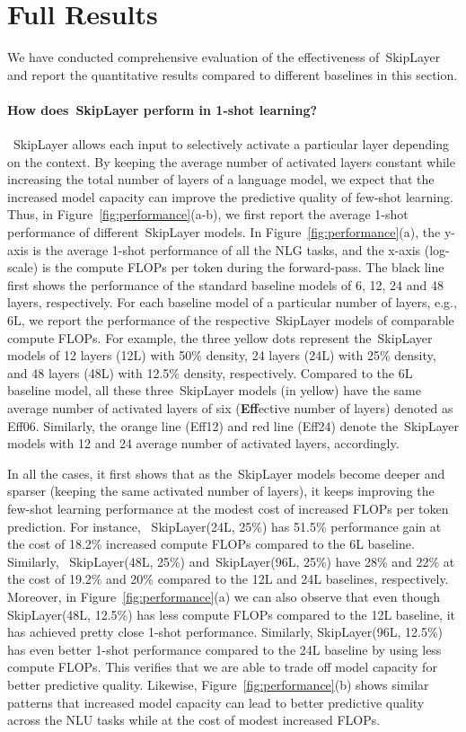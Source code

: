 \documentclass{article}
\newcommand{\skipl}{SkipLayer\xspace}
\begin{document}
\section{Full Results}
We have conducted comprehensive evaluation of the effectiveness of~\skipl and report the quantitative results compared to different baselines in this section.

\paragraph{How does~\skipl perform in 1-shot learning?}~\skipl allows each input to selectively activate a particular layer depending on the context. By keeping the average number of activated layers constant while increasing the total number of layers of a language model, we expect that the increased model capacity can improve the predictive quality of few-shot learning. Thus, in Figure~\ref{fig:performance}(a-b), we first report the average 1-shot performance of different~\skipl models. In Figure~\ref{fig:performance}(a), the y-axis is the average 1-shot performance of all the NLG tasks, and the x-axis (log-scale) is the compute FLOPs per token during the forward-pass. The black line first shows the performance of the standard baseline models of 6, 12, 24 and 48 layers, respectively. For each baseline model of a particular number of layers, e.g., 6L, we report the performance of the respective~\skipl models of comparable compute FLOPs. For example, the three yellow dots represent the~\skipl models of 12 layers (12L) with 50\% density, 24 layers (24L) with 25\% density, and 48 layers (48L) with 12.5\% density, respectively. Compared to the 6L baseline model, all these three~\skipl models (in yellow) have the same average number of activated layers of six ({\textbf{Eff}}ective number of layers) denoted as Eff06. Similarly, the orange line (Eff12) and red line (Eff24) denote the~\skipl models with 12 and 24 average number of activated layers, accordingly.

In all the cases, it first shows that as the~\skipl models become deeper and sparser (keeping the same activated number of layers), it keeps improving the few-shot learning performance at the modest cost of increased FLOPs per token prediction. For instance, ~\skipl(24L, 25\%) has 51.5\% performance gain at the cost of 18.2\% increased compute FLOPs compared to the 6L baseline. Similarly, ~\skipl(48L, 25\%) and~\skipl(96L, 25\%) have 28\% and 22\% at the cost of 19.2\% and 20\% compared to the 12L and 24L baselines, respectively. Moreover, in Figure~\ref{fig:performance}(a) we can also observe that even though \skipl (48L, 12.5\%) has less compute FLOPs compared to the 12L baseline, it has achieved pretty close 1-shot performance. Similarly, \skipl (96L, 12.5\%) has even better 1-shot performance compared to the 24L baseline by using less compute FLOPs. This verifies that we are able to trade off model capacity for better predictive quality.
%
Likewise, Figure~\ref{fig:performance}(b) shows similar patterns that increased model capacity can lead to better predictive quality across the NLU tasks while at the cost of modest increased FLOPs.
\end{document}
